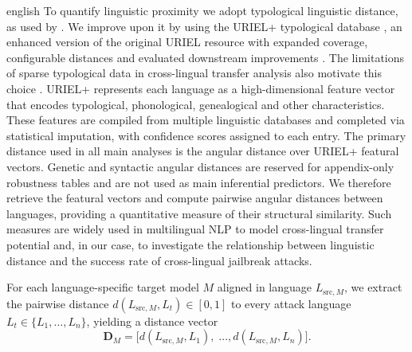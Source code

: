 \begin{otherlanguage*}{english}
To quantify linguistic proximity we adopt typological linguistic distance, as used by \textcite{philippyIdentifyingCorrelationLanguage2023}. We improve upon it by using the URIEL+ typological database \cite{khan-etal-2025-uriel}, an enhanced version of the original URIEL resource \cite{littell-etal-2017-uriel} with expanded coverage, configurable distances and evaluated downstream improvements \cite{khan-etal-2025-uriel}. The limitations of sparse typological data in cross-lingual transfer analysis also motivate this choice \cite{khiu-etal-2024-predicting}. URIEL+ represents each language as a high-dimensional feature vector that encodes typological, phonological, genealogical and other characteristics. These features are compiled from multiple linguistic databases and completed via statistical imputation, with confidence scores assigned to each entry. The primary distance used in all main analyses is the angular distance over URIEL+ featural vectors. Genetic and syntactic angular distances are reserved for appendix-only robustness tables and are not used as main inferential predictors. We therefore retrieve the featural vectors and compute pairwise angular distances between languages, providing a quantitative measure of their structural similarity. Such measures are widely used in multilingual NLP to model cross-lingual transfer potential and, in our case, to investigate the relationship between linguistic distance and the success rate of cross-lingual jailbreak attacks.

For each language-specific target model $M$ aligned in language $L_{\mathrm{src},M}$, we extract the pairwise distance 
$d(L_{\mathrm{src},M}, L_t) \in [0,1]$ to every attack language $L_t \in \{L_1,\dots,L_n\}$, yielding a distance vector
\begin{equation}
\mathbf{D}_M = \bigl[d(L_{\mathrm{src},M},L_1),\; \dots,
d(L_{\mathrm{src},M},L_n)\bigr].
\label{eq:distance-vector}
\end{equation}


\end{otherlanguage*}
